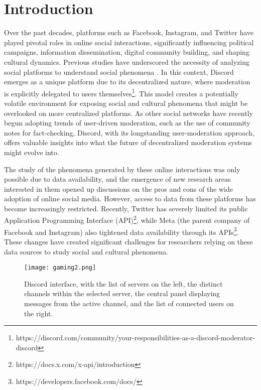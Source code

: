 \section{Introduction}

Over the past decades, platforms such as Facebook, Instagram, and Twitter have played pivotal roles in online social interactions, significantly influencing political campaigns, information dissemination, digital community building, and shaping cultural dynamics. Previous studies have underscored the necessity of analyzing social platforms to understand social phenomena \cite{hate-speech-reddit-savvas, moderation-importance-qanon, facebook-1}. In this context, Discord emerges as a unique platform due to its decentralized nature, where moderation is explicitly delegated to users themselves\footnote{https://discord.com/community/your-responsibilities-as-a-discord-moderator-discord}. This model creates a potentially volatile environment for exposing social and cultural phenomena that might be overlooked on more centralized platforms. As other social networks have recently begun adopting trends of user-driven moderation, such as the use of community notes for fact-checking, Discord, with its longstanding user-moderation approach, offers valuable insights into what the future of decentralized moderation systems might evolve into.

The study of the phenomena generated by these online interactions was only possible due to data availability, and the emergence of new research areas interested in them opened up discussions on the pros and cons of the wide adoption of online social media. However, access to data from these platforms has become increasingly restricted. Recently, Twitter has severely limited its public Application Programming Interface (API)\footnote{https://docs.x.com/x-api/introduction}, while Meta (the parent company of Facebook and Instagram) also tightened data availability through its APIs\footnote{https://developers.facebook.com/docs/}. These changes have created significant challenges for researchers relying on these data sources to study social and cultural phenomena. 

\begin{figure*} [!h]
    \centering
    \texttt{[image: gaming2.png]}
    \caption{Discord interface, with the list of servers on the left, the distinct channels within the selected server, the central panel displaying messages from the active channel, and the list of connected users on the right.}
    \label{fig:disc}
\end{figure*} 


